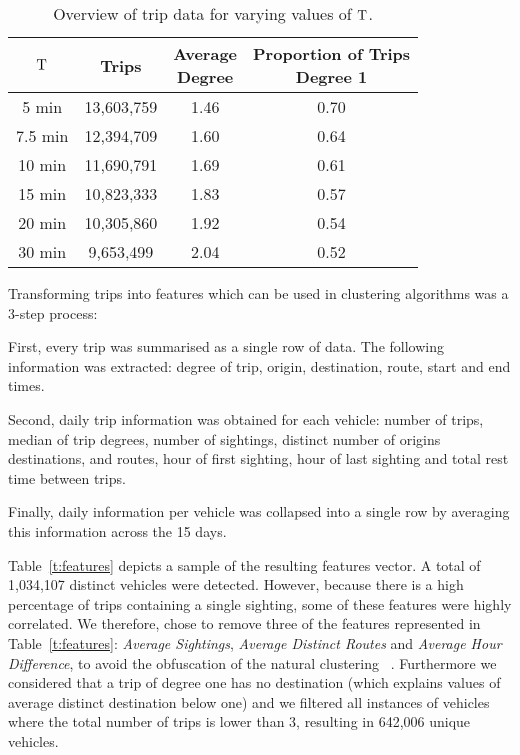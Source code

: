 \begin{table}[t]
\centering
\tabcolsep=0.25cm
\begin{tabular}{c c c c}
  \hline
$\mathrm{T}$ & Trips & \thead{Average\\Degree} & \thead{Proportion of Trips \\ Degree 1} \\
  \hline
5 min & 13,603,759 & 1.46 & 0.70 \\
7.5 min & 12,394,709 & 1.60 & 0.64 \\
10 min & 11,690,791 & 1.69 & 0.61 \\
15 min & 10,823,333 & 1.83 & 0.57 \\
20 min & 10,305,860 & 1.92 & 0.54 \\
30 min &  9,653,499 & 2.04 & 0.52 \\
   \hline
\end{tabular}
\caption{Overview of trip data for varying values of $\mathrm{T}$.}
\label{t:trips-tau}
\vspace{-0.5cm}
\end{table}

Transforming trips into features which can be used in clustering algorithms was a 3-step process:
\begin{enumerate*}[label=(\roman*)]
  \item First, every trip was summarised as a single row of data. The following information was extracted: degree of trip, origin, destination, route, start and end times.
  \item Second, daily trip information was obtained for each vehicle: number of trips, median of trip degrees, number of sightings, distinct number of origins destinations, and routes, hour of first sighting, hour of last sighting and total rest time between trips.
  \item Finally, daily information per vehicle was collapsed into a single row by averaging this information across the 15 days.
\end{enumerate*}

Table~\ref{t:features} depicts a sample of the resulting features vector. A total of 1,034,107 distinct vehicles were detected. However, because there is a high percentage of trips containing a single sighting, some of these features were highly correlated. We therefore, chose to remove three of the features represented in Table~\ref{t:features}: \emph{Average Sightings}, \emph{Average Distinct Routes} and \emph{Average Hour Difference}, to avoid the obfuscation of the natural clustering ~\cite{Kmeans}. Furthermore we considered that a trip of degree one has no destination (which explains values of average distinct destination below one) and we filtered all instances of vehicles where the total number of trips is lower than 3, resulting in 642,006 unique vehicles.


